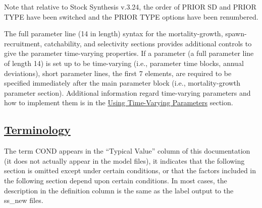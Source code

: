 Note that relative to Stock Synthesis v.3.24, the order of PRIOR SD and PRIOR TYPE have been switched and the PRIOR TYPE options have been renumbered.

The full parameter line (14 in length) syntax for the mortality-growth, spawn-recruitment, catchability, and selectivity sections provides additional controls to give the parameter time-varying properties. If a parameter (a full parameter line of length 14) is set up to be time-varying (i.e., parameter time blocks, annual deviations), short parameter lines, the first 7 elements, are required to be specified immediately after the main parameter block (i.e., mortality-growth parameter section). Additional information regard time-varying parameters and how to implement them is in the \hyperlink{TVpara}{Using Time-Varying Parameters} section.

\hypertarget{ControlTerminology}{}
\subsection[Terminology]{\protect\hyperlink{ControlTerminology}{Terminology}}
The term COND appears in the ``Typical Value'' column of this documentation (it does not actually appear in the model files), it indicates that the following section is omitted except under certain conditions, or that the factors included in the following section depend upon certain conditions. In most cases, the description in the definition column is the same as the label output to the ss\_new files.

\hypertarget{ControlInputs}{}
